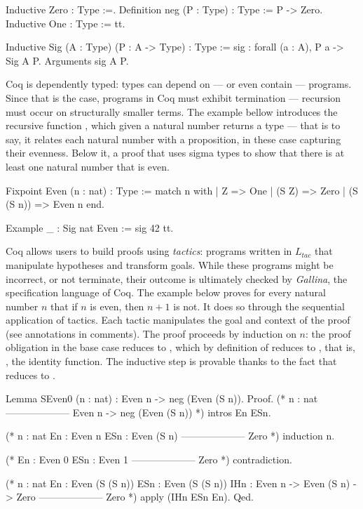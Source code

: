 \documentclass{mproj}
\begin{document}
\begin{coq}
    Inductive Zero : Type :=.
    Definition neg (P : Type) : Type := P -> Zero.
    Inductive One : Type := tt.

    Inductive Sig (A : Type) (P : A -> Type) : Type :=
      sig : forall (a : A), P a -> Sig A P.
    Arguments sig {A P}.
\end{coq}

Coq is dependently typed: types can depend on --- or even contain --- programs. Since that is the case, programs in Coq must exhibit termination --- recursion must occur on structurally smaller terms. The example bellow introduces the recursive function , which given a natural number returns a type --- that is to say, it relates each natural number with a proposition, in these case capturing their evenness. Below it, a proof that uses sigma types to show that there is at least one natural number that is even.

\begin{coq}
    Fixpoint Even (n : nat) : Type :=
      match n with
      | Z         => One
      | (S Z)     => Zero
      | (S (S n)) => Even n
      end.

    Example _ : Sig nat Even := sig 42 tt.
\end{coq}

Coq allows users to build proofs using \emph{tactics}: programs written in $L_{tac}$ that manipulate hypotheses and transform goals. While these programs might be incorrect, or not terminate, their outcome is ultimately checked by \emph{Gallina}, the specification language of Coq. The example below proves for every natural number $n$ that if $n$ is even, then $n+1$ is not. It does so through the sequential application of tactics. Each tactic manipulates the goal and context of the proof (see annotations in comments). The proof proceeds by induction on $n$: the proof obligation in the base case reduces to , which by definition of  reduces to , that is, , the identity function. The inductive step is provable thanks to the fact that  reduces to .

\begin{coq}
    Lemma SEven0 (n : nat) : Even n -> neg (Even (S n)).
    Proof.
      (* n : nat
         --------------------
         Even n -> neg (Even (S n)) *)
      intros En ESn.

      (* n : nat 
         En : Even n
         ESn : Even (S n)
         --------------------
         Zero *)
      induction n.

      (* En : Even 0
         ESn : Even 1
         --------------------
         Zero *)
      contradiction.

      (* n : nat
         En : Even (S (S n))
         ESn : Even (S (S n))
         IHn : Even n -> Even (S n) -> Zero
         --------------------
         Zero *)
      apply (IHn ESn En).
    Qed.
\end{coq}
\end{document}

